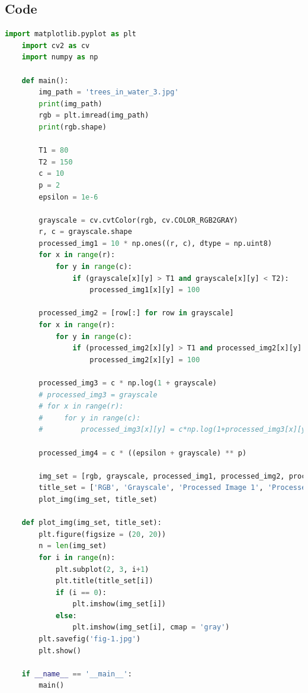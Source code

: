 \documentclass{article}
\begin{document}
{    \subsection{Code}
    \lstset{style=mystyle}
    \begin{lstlisting}[language=Python, caption=Code for point processing and thresholding]
    import matplotlib.pyplot as plt
    import cv2 as cv
    import numpy as np
    
    def main():
        img_path = 'trees_in_water_3.jpg'
        print(img_path)
        rgb = plt.imread(img_path)
        print(rgb.shape)
    
        T1 = 80
        T2 = 150
        c = 10
        p = 2
        epsilon = 1e-6
    
        grayscale = cv.cvtColor(rgb, cv.COLOR_RGB2GRAY)
        r, c = grayscale.shape
        processed_img1 = 10 * np.ones((r, c), dtype = np.uint8)
        for x in range(r):
            for y in range(c):
                if (grayscale[x][y] > T1 and grayscale[x][y] < T2):
                    processed_img1[x][y] = 100
                    
        processed_img2 = [row[:] for row in grayscale]
        for x in range(r):
            for y in range(c):
                if (processed_img2[x][y] > T1 and processed_img2[x][y] < T2):
                    processed_img2[x][y] = 100
    
        processed_img3 = c * np.log(1 + grayscale)
        # processed_img3 = grayscale
        # for x in range(r):
        #     for y in range(c):
        #         processed_img3[x][y] = c*np.log(1+processed_img3[x][y])
    
        processed_img4 = c * ((epsilon + grayscale) ** p)
    
        img_set = [rgb, grayscale, processed_img1, processed_img2, processed_img3, processed_img4]
        title_set = ['RGB', 'Grayscale', 'Processed Image 1', 'Processed Image 2', 'Processed Image 3', 'Processed Image 4']
        plot_img(img_set, title_set)
    
    def plot_img(img_set, title_set):
        plt.figure(figsize = (20, 20))
        n = len(img_set)    
        for i in range(n):
            plt.subplot(2, 3, i+1)
            plt.title(title_set[i])
            if (i == 0):
                plt.imshow(img_set[i])
            else:
                plt.imshow(img_set[i], cmap = 'gray')
        plt.savefig('fig-1.jpg')    
        plt.show()
    
    if __name__ == '__main__':
        main()


\end{lstlisting}}
\end{document}
